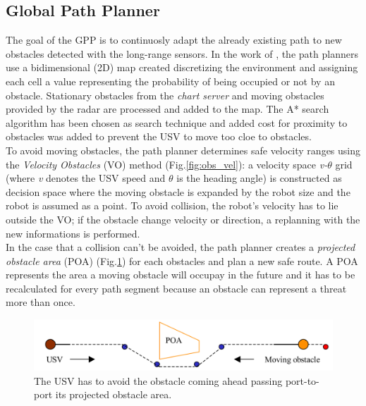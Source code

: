 \documentclass[12pt]{article}
\begin{document}
        \subsection{Global Path Planner} \label{gpp}

              The goal of the GPP is to continuosly adapt the already existing path to new obstacles detected with the long-range sensors. In the work of \textcite{Larson2007,Larson2007a}, the path planners use a bidimensional (2D) map created discretizing the environment and assigning each cell a value representing the probability of being occupied or not by an obstacle. Stationary obstacles from the \textit{chart server} and moving obstacles provided by the radar are processed and added to the map. The A* search algorithm \parencite{4082128} has been chosen as search technique and added cost for proximity to obstacles was added to prevent the USV to move too cloe to obstacles.\\
              To avoid moving obstacles, the path planner determines safe velocity ranges using the \textit{Velocity Obstacles} (VO) method (Fig.\ref{fig:obs_vel}): a velocity space \textit{v-$\theta$} grid (where \textit{v} denotes the USV speed and \textit{$\theta$} is the heading angle) is constructed as decision space where the moving obstacle is expanded by the robot size and the robot is assumed as a point. To avoid collision, the robot's velocity has to lie outside the VO; if the obstacle change velocity or direction, a replanning with the new informations is performed.\\
              In the case that a collision can't be avoided, the path planner creates a \textit{projected obstacle area} (POA) (Fig.\ref{fig:poa}) for each obstacles and plan a new safe route. A POA represents the area a moving obstacle will occupay in the future and it has to be recalculated for every path segment because an obstacle can represent a threat more than once.

              \begin{figure}
                    \centering
                    \includegraphics[width=\columnwidth]{./Images/Larson/poa}
                    \caption{The USV has to avoid the obstacle coming ahead passing port-to-port its projected obstacle area.}
                    \label{fig:poa}
              \end{figure}
\end{document}
